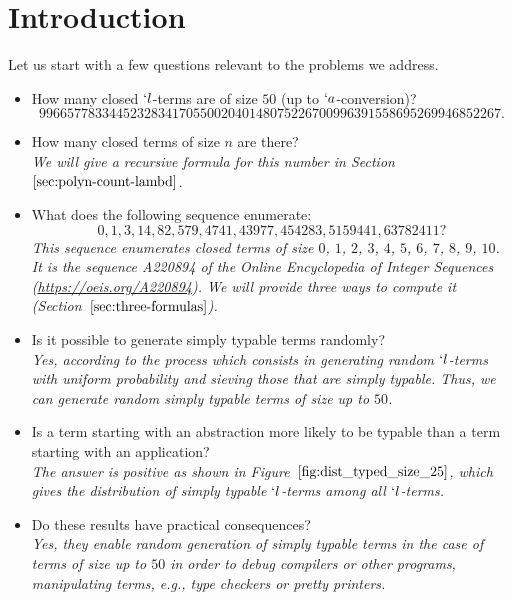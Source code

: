 \documentclass{jfp1}
\begin{document}
\section{Introduction}
\label{sec:introduction}

Let us start with a few questions relevant to the problems we address.
\begin{itemize}
\item How many closed $`l$-terms are of size $50$ (up to $`a$-conversion)?
\[996657783344523283417055002040148075226700996391558695269946852267.\]
\item How many closed terms of size $n$ are there?\\
\emph{We will give a recursive formula for this number in Section~$\ref{sec:polyn-count-lambd}$.}
\item What does the following sequence enumerate:
  \[ 0, 1, 3, 14, 82, 579, 4741, 43977, 454283, 5159441, 63782411?\] \emph{This
    sequence enumerates closed terms of size $0$, $1$, $2$, $3$, $4$, $5$, $6$, $7$,
    $8$, $9$, $10$.  It is the sequence A220894 of the Online Encyclopedia of Integer
    Sequences (\url{https://oeis.org/A220894}).  We will provide three ways to compute
    it (Section~$\ref{sec:three-formulas}$). }
\item Is it possible to generate simply typable terms randomly?\\
  \emph{Yes, according to the process which consists in generating random $`l$-terms
    with uniform probability and sieving those that are simply typable.  Thus, we can
    generate random simply typable terms of size up to $50$.}
\item Is a term starting with an abstraction more likely to be typable than a term
  starting with an application?\\
\emph{The answer is positive as shown in Figure~$\ref{fig:dist_typed_size_25}$,
  which gives the distribution of simply typable $`l$-terms among all $`l$-terms.}
\item Do these results have practical consequences?\\
\emph{Yes, they enable random generation of simply typable terms in the case of terms of size
  up to $50$ in order to debug compilers or other programs,
  manipulating terms, e.g., type checkers or pretty printers.}
\end{itemize}
\end{document}
